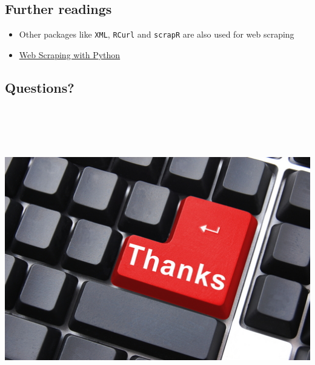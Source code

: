 \subsection{Further readings}\label{further-readings}

\begin{itemize}
\tightlist
\item
  Other packages like \texttt{XML}, \texttt{RCurl} and \texttt{scrapR}
  are also used for web scraping
\item
  \href{https://yanfei.site/docs/dpsa/references/PyWebScrapingBook.pdf}{Web
  Scraping with Python}
\end{itemize}

\subsection{Questions?}\label{questions}

\includegraphics[width=7.29167in,height=5.20833in]{thanks.jpg}

